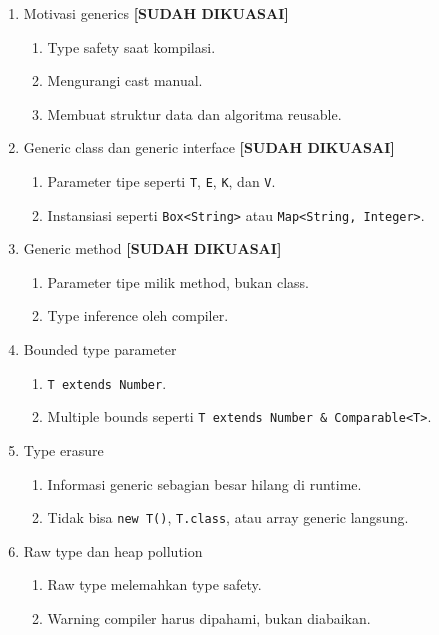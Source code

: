 \begin{enumerate}
    \item Motivasi generics \textbf{[SUDAH DIKUASAI]}
    \begin{enumerate}
        \item Type safety saat kompilasi.
        \item Mengurangi cast manual.
        \item Membuat struktur data dan algoritma reusable.
    \end{enumerate}
    \item Generic class dan generic interface \textbf{[SUDAH DIKUASAI]}
    \begin{enumerate}
        \item Parameter tipe seperti \texttt{T}, \texttt{E}, \texttt{K}, dan \texttt{V}.
        \item Instansiasi seperti \texttt{Box<String>} atau \texttt{Map<String, Integer>}.
    \end{enumerate}
    \item Generic method \textbf{[SUDAH DIKUASAI]}
    \begin{enumerate}
        \item Parameter tipe milik method, bukan class.
        \item Type inference oleh compiler.
    \end{enumerate}
    \item Bounded type parameter
    \begin{enumerate}
        \item \texttt{T extends Number}.
        \item Multiple bounds seperti \texttt{T extends Number \& Comparable<T>}.
    \end{enumerate}
    \item Type erasure
    \begin{enumerate}
        \item Informasi generic sebagian besar hilang di runtime.
        \item Tidak bisa \texttt{new T()}, \texttt{T.class}, atau array generic langsung.
    \end{enumerate}
    \item Raw type dan heap pollution
    \begin{enumerate}
        \item Raw type melemahkan type safety.
        \item Warning compiler harus dipahami, bukan diabaikan.
    \end{enumerate}
\end{enumerate}

